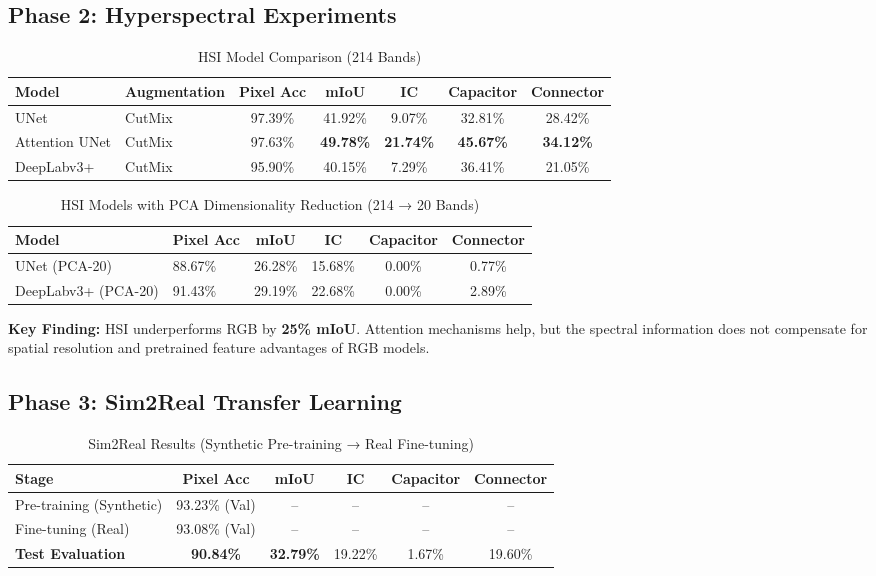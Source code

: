 \documentclass[12pt,a4paper]{article}
\begin{document}
\subsection{Phase 2: Hyperspectral Experiments}

\begin{table}[H]
\centering
\caption{HSI Model Comparison (214 Bands)}
\label{tab:hsi_results}
\begin{tabular}{llccccc}
\toprule
\textbf{Model} & \textbf{Augmentation} & \textbf{Pixel Acc} & \textbf{mIoU} & \textbf{IC} & \textbf{Capacitor} & \textbf{Connector} \\
\midrule
UNet & CutMix & 97.39\% & 41.92\% & 9.07\% & 32.81\% & 28.42\% \\
Attention UNet & CutMix & 97.63\% & \textbf{49.78\%} & \textbf{21.74\%} & \textbf{45.67\%} & \textbf{34.12\%} \\
DeepLabv3+ & CutMix & 95.90\% & 40.15\% & 7.29\% & 36.41\% & 21.05\% \\
\bottomrule
\end{tabular}
\end{table}

\begin{table}[H]
\centering
\caption{HSI Models with PCA Dimensionality Reduction (214 → 20 Bands)}
\label{tab:hsi_pca_results}
\begin{tabular}{llcccc}
\toprule
\textbf{Model} & \textbf{Pixel Acc} & \textbf{mIoU} & \textbf{IC} & \textbf{Capacitor} & \textbf{Connector} \\
\midrule
UNet (PCA-20) & 88.67\% & 26.28\% & 15.68\% & 0.00\% & 0.77\% \\
DeepLabv3+ (PCA-20) & 91.43\% & 29.19\% & 22.68\% & 0.00\% & 2.89\% \\
\bottomrule
\end{tabular}
\end{table}

\textbf{Key Finding:} HSI underperforms RGB by \textbf{25\% mIoU}. Attention mechanisms help, but the spectral information does not compensate for spatial resolution and pretrained feature advantages of RGB models.

\subsection{Phase 3: Sim2Real Transfer Learning}

\begin{table}[H]
\centering
\caption{Sim2Real Results (Synthetic Pre-training → Real Fine-tuning)}
\label{tab:sim2real}
\begin{tabular}{lccccc}
\toprule
\textbf{Stage} & \textbf{Pixel Acc} & \textbf{mIoU} & \textbf{IC} & \textbf{Capacitor} & \textbf{Connector} \\
\midrule
Pre-training (Synthetic) & 93.23\% (Val) & -- & -- & -- & -- \\
Fine-tuning (Real) & 93.08\% (Val) & -- & -- & -- & -- \\
\textbf{Test Evaluation} & \textbf{90.84\%} & \textbf{32.79\%} & 19.22\% & \textcolor{poorresult}{1.67\%} & 19.60\% \\
\bottomrule
\end{tabular}
\end{table}
\end{document}
